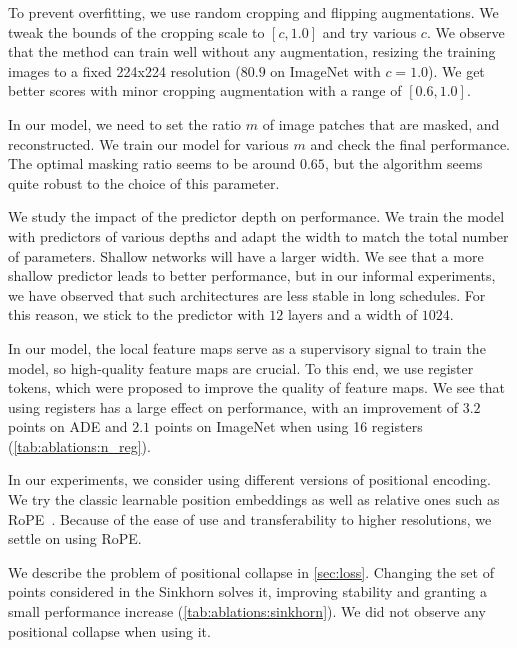 To prevent overfitting, we use random cropping and flipping augmentations.
We tweak the bounds of the cropping scale to $[c, 1.0]$ and try various $c$.
We observe that the method can train well without any augmentation, resizing the training images to a fixed 224x224 resolution ($80.9$ on ImageNet with $c=1.0$).
We get better scores with minor cropping augmentation with a range of $[0.6,1.0]$.

In our model, we need to set the ratio $m$ of image patches that are masked, and reconstructed.
We train our model for various $m$ and check the final performance.
The optimal masking ratio seems to be around $0.65$, but the algorithm seems quite robust to the choice of this parameter.

We study the impact of the predictor depth on performance.
We train the model with predictors of various depths and adapt the width to match the total number of parameters.
Shallow networks will have a larger width.
We see that a more shallow predictor leads to better performance, but in our informal experiments, we have observed that such architectures are less stable in long schedules.
For this reason, we stick to the predictor with $12$ layers and a width of $1024$.


In our model, the local feature maps serve as a supervisory signal to train the model, so high-quality feature maps are crucial.
To this end, we use register tokens, which were proposed to improve the quality of feature maps.
We see that using registers has a large effect on performance, with an improvement of $3.2$ points on ADE and $2.1$ points on ImageNet when using 16 registers (\cref{tab:ablations:n_reg}).

In our experiments, we consider using different versions of positional encoding.
We try the classic learnable position embeddings as well as relative ones such as RoPE~\citep{rope}.
Because of the ease of use and transferability to higher resolutions, we settle on using RoPE.

We describe the problem of positional collapse in \cref{sec:loss}.
Changing the set of points considered in the Sinkhorn solves it, improving stability and granting a small performance increase (\cref{tab:ablations:sinkhorn}).
We did not observe any positional collapse when using it.

